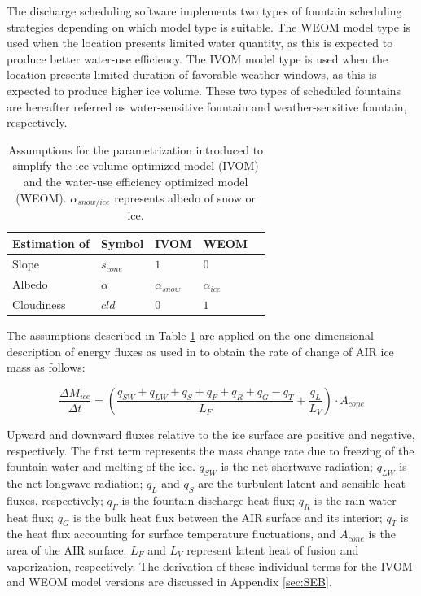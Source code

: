 \documentclass[tc, manuscript]{copernicus}
\begin{document}
The discharge scheduling software implements two types of fountain scheduling strategies depending on which
model type is suitable. The WEOM model type is used when the location presents limited water quantity, as this
is expected to produce better water-use efficiency. The IVOM model type is used when the location presents
limited duration of favorable weather windows, as this is expected to produce higher ice volume. These two types
of scheduled fountains are hereafter referred as water-sensitive fountain and weather-sensitive fountain,
respectively.

\begin{table}[htb]
\centering
\caption{Assumptions for the parametrization introduced to simplify the ice volume optimized model (IVOM) and the
water-use efficiency optimized model (WEOM). $\alpha_{snow/ice}$ represents albedo of snow or ice.}
\label{tab:assumptions}
\begin{tabular}{@{}lllll@{}}
\toprule
\textbf{Estimation of} & \textbf{Symbol} & \textbf{IVOM} & \textbf{WEOM} & \\ \midrule
\multicolumn{1}{|l}{Slope}        & $s_{cone}$ & $ 1 $ & $0$ & \multicolumn{1}{l|}{} \\ \midrule
\multicolumn{1}{|l}{Albedo} & $\alpha$ & $\alpha_{snow}$ & $\alpha_{ice}$ & \multicolumn{1}{l|}{} \\\midrule 
\multicolumn{1}{|l}{Cloudiness}  & $cld$ & $0$ & $1$ & \multicolumn{1}{l|}{} \\ \bottomrule
\end{tabular}
\end{table}

The assumptions described in Table \ref{tab:assumptions} are applied on the one-dimensional description of
energy fluxes as used in \cite{balasubramanianInfluenceMeteorologicalConditions2022} to obtain the rate of
change of AIR ice mass as follows: 

\begin{equation}
  \frac{\Delta M_{ice}}{\Delta t}  =  (\frac{q_{SW} + q_{LW} + q_{S} + q_{F} + q_{R} + q_{G} - q_{T}}{L_F} + \frac{q_{L}}{L_V} ) \cdot A_{cone}
	\label{eqn:auto}
\end{equation}

Upward and downward fluxes relative to the ice surface are positive and negative, respectively. The first term
represents the mass change rate due to freezing of the fountain water and melting of the ice. $q_{SW}$ is the
net shortwave radiation; $q_{LW}$ is the net longwave radiation; $q_{L}$ and $q_{S}$ are the turbulent latent
and sensible heat fluxes, respectively; $q_{F}$ is the fountain discharge heat flux; $q_{R}$ is the rain water
heat flux; $q_{G}$ is the bulk heat flux between the AIR surface and its interior; $q_{T}$ is the heat flux
accounting for surface temperature fluctuations, and $A_{cone}$ is the area of the AIR surface. $L_F$ and
$L_{V}$ represent latent heat of fusion and vaporization, respectively. The derivation of these individual terms
for the IVOM and WEOM model versions are discussed in Appendix \ref{sec:SEB}.
\end{document}
